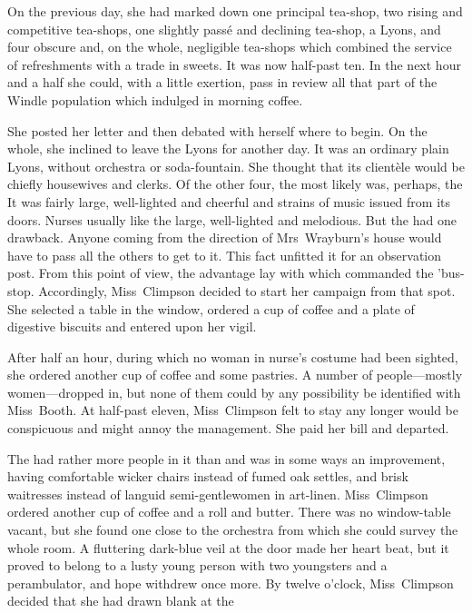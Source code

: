On the previous day, she had marked down one principal tea-shop, two rising and competitive tea-shops, one slightly passé and declining tea-shop, a Lyons, and four obscure and, on the whole, negligible tea-shops which combined the service of refreshments with a trade in sweets. It was now half-past ten. In the next hour and a half she could, with a little exertion, pass in review all that part of the Windle population which indulged in morning coffee.

She posted her letter and then debated with herself where to begin. On the whole, she inclined to leave the Lyons for another day. It was an ordinary plain Lyons, without orchestra or soda-fountain. She thought that its clientèle would be chiefly housewives and clerks. Of the other four, the most likely was, perhaps, the  It was fairly large, well-lighted and cheerful and strains of music issued from its doors. Nurses usually like the large, well-lighted and melodious. But the  had one drawback. Anyone coming from the direction of Mrs~Wrayburn's house would have to pass all the others to get to it. This fact unfitted it for an observation post. From this point of view, the advantage lay with  which commanded the 'bus-stop. Accordingly, Miss~Climpson decided to start her campaign from that spot. She selected a table in the window, ordered a cup of coffee and a plate of digestive biscuits and entered upon her vigil.

After half an hour, during which no woman in nurse's costume had been sighted, she ordered another cup of coffee and some pastries. A number of people—mostly women—dropped in, but none of them could by any possibility be identified with Miss~Booth. At half-past eleven, Miss~Climpson felt to stay any longer would be conspicuous and might annoy the management. She paid her bill and departed.

The  had rather more people in it than  and was in some ways an improvement, having comfortable wicker chairs instead of fumed oak settles, and brisk waitresses instead of languid semi-gentlewomen in art-linen. Miss~Climpson ordered another cup of coffee and a roll and butter. There was no window-table vacant, but she found one close to the orchestra from which she could survey the whole room. A fluttering dark-blue veil at the door made her heart beat, but it proved to belong to a lusty young person with two youngsters and a perambulator, and hope withdrew once more. By twelve o'clock, Miss~Climpson decided that she had drawn blank at the 

